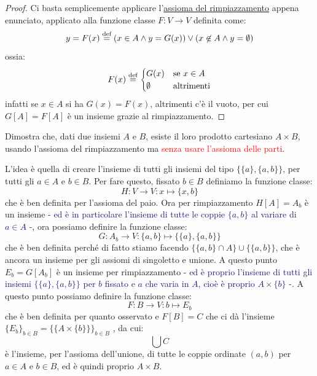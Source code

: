 \begin{proof}
	Ci basta semplicemente applicare l'\hyperref[ax8]{assioma del rimpiazzamento} appena enunciato, applicato alla funzione classe $F : V \rightarrow V$ definita come:
	\[ y = F(x) \overset{\text{def}}{=} (x \in A \land y = G(x)) \lor (x \not \in A \land y = \emptyset)
		\]
	ossia:
	\[ F(x) \overset{\text{def}}{=} \begin{cases}
		G(x) &\text{se $x \in A$} \\
		\emptyset &\text{altrimenti}
	\end{cases}
		\]
	infatti se $x \in A$ si ha $G(x) = F(x)$, altrimenti c'è il vuoto, per cui $G[A] = F[A]$ è un insieme grazie al rimpiazzamento.
\end{proof}

\begin{exercise}
	Dimostra che, dati due insiemi $A$ e $B$, esiste il loro prodotto cartesiano $A \times B$, usando l'assioma del rimpiazzamento ma \textcolor{red}{senza usare l'assioma delle parti}.
\end{exercise}

\begin{soln}
	L'idea è quella di creare l'insieme di tutti gli insiemi del tipo $\{\{a\},\{a,b\}\}$, per tutti gli $a \in A$ e $b \in B$. Per fare questo, fissato $b \in B$ definiamo la funzione classe:
	\[ H : V \to V : x \mapsto \{x,b\}
		\]
	che è ben definita per l'assioma del paio. Ora per rimpiazzamento $H[A] = A_b$ è un insieme \textcolor{MidnightBlue}{- ed è in particolare l'insieme di tutte le coppie $\{a,b\}$ al variare di $a \in A$ -},
	ora possiamo definire la funzione classe:
	\[ G : A_b \to V : \{a,b\} \mapsto \{\{a\},\{a,b\}\}
		\]
	che è ben definita perché di fatto stiamo facendo $\{\{a,b\}\cap A\} \cup \{\{a,b\}\}$, che è ancora un insieme per gli assiomi di singoletto e unione. A questo punto $E_b = G[A_b]$ 
	è un insieme per rimpiazzamento \textcolor{MidnightBlue}{- ed è proprio l'insieme di tutti gli insiemi $\{\{a\},\{a,b\}\}$ per $b$ fissato e $a$ che varia in $A$, cioè è proprio $A \times \{b\}$ -}.
	A questo punto possiamo definire la funzione classe:
	\[ F : B \to V : b \mapsto E_b
		\]
	che è ben definita per quanto osservato e $F[B] = C$ che ci dà l'insieme $\{E_b\}_{b \in B} = \{\{A \times \{b\}\}\}_{b \in B}$ , da cui:
	\[ \bigcup C
		\]
	è l'insieme, per l'assioma dell'unione, di tutte le coppie ordinate $(a,b)$ per $a \in A$ e $b \in B$, ed è quindi proprio $A \times B$.
\end{soln}

